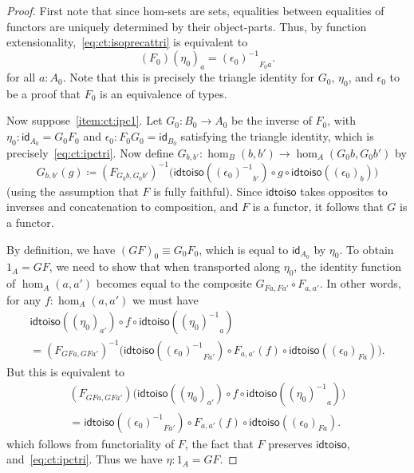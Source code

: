 \documentclass{amsart}
\newcommand{\jdeq}{\equiv}      %
\newcommand{\defeq}{\coloneqq}  %
\newcommand{\opp}[1]{\mathord{{#1}^{-1}}}
\newcommand{\map}[2]{\ensuremath{{#1}\left({#2}\right)}\xspace}
\newcommand{\idfunc}[1][]{\ensuremath{\mathsf{id}_{#1}}\xspace}
\theoremstyle{definition}
\theoremstyle{remark}
\numberwithin{equation}{section}
\newcommand{\inv}[1]{{#1}^{-1}}
\newcommand{\idtoiso}{\ensuremath{\mathsf{idtoiso}}\xspace}
\begin{document}
\begin{proof}
  First note that since hom-sets are sets, equalities between equalities of functors are uniquely determined by their object-parts.
  Thus, by function extensionality,~\eqref{eq:ct:isoprecattri} is equivalent to
  \begin{equation}
    \map{(F_0)}{\eta_0}_a = \opp{(\epsilon_0)}_{F_0 a}.\label{eq:ct:ipctri}
  \end{equation}
  for all $a:A_0$.
  Note that this is precisely the triangle identity for $G_0$, $\eta_0$, and $\epsilon_0$ to be a proof that $F_0$ is an equivalence of types.

  Now suppose~\ref{item:ct:ipc1}.
  Let $G_0:B_0 \to A_0$ be the inverse of $F_0$, with $\eta_0: \idfunc[A_0] = G_0 F_0$ and $\epsilon_0:F_0G_0 = \idfunc[B_0]$ satisfying the triangle identity, which is precisely~\eqref{eq:ct:ipctri}.
  Now define $G_{b,b'}:\hom_B(b,b') \to \hom_A(G_0b,G_0b')$ by
  \[ G_{b,b'}(g) \defeq
  \inv{(F_{G_0b,G_0b'})}\Big(\idtoiso(\opp{(\epsilon_0)}_{b'}) \circ g \circ \idtoiso((\epsilon_0)_b)\Big)
  \]
  (using the assumption that $F$ is fully faithful).
  Since \idtoiso takes opposites to inverses and concatenation to composition, and $F$ is a functor, it follows that $G$ is a functor.

  By definition, we have $(GF)_0 \jdeq G_0 F_0$, which is equal to $\idfunc[A_0]$ by $\eta_0$.
  To obtain $1_A = GF$, we need to show that when transported along $\eta_0$, the identity function of $\hom_A(a,a')$ becomes equal to the composite $G_{Fa,Fa'} \circ F_{a,a'}$.
  In other words, for any $f:\hom_A(a,a')$ we must have
  \begin{multline*}
    \idtoiso((\eta_0)_{a'}) \circ f \circ \idtoiso(\opp{(\eta_0)}_a)\\
    = \inv{(F_{GFa,GFa'})}\Big(\idtoiso(\opp{(\epsilon_0)}_{Fa'})
    \circ F_{a,a'}(f) \circ \idtoiso((\epsilon_0)_{Fa})\Big).
  \end{multline*}
  But this is equivalent to
  \begin{multline*}
    (F_{GFa,GFa'})\Big(\idtoiso((\eta_0)_{a'}) \circ f \circ \idtoiso(\opp{(\eta_0)}_a)\Big)\\
    = \idtoiso(\opp{(\epsilon_0)}_{Fa'})
    \circ F_{a,a'}(f) \circ \idtoiso((\epsilon_0)_{Fa}).
  \end{multline*}
  which follows from functoriality of $F$, the fact that $F$ preserves \idtoiso, and~\eqref{eq:ct:ipctri}.
  Thus we have $\eta:1_A = GF$.


\end{proof}
\end{document}

